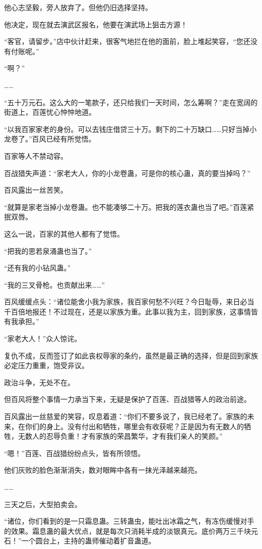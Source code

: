 \begin{this_body}
他心志坚毅，旁人放弃了。但他仍旧选择坚持。

他决定，现在就去演武区报名，他要在演武场上狙击方源！

“客官，请留步。”店中伙计赶来，很客气地拦在他的面前，脸上堆起笑容，“您还没有付账呢。”

“啊？”

……

“五十万元石。这么大的一笔款子，还只给我们一天时间，怎么筹啊？”走在宽阔的街道上，百莲忧心忡忡地道。

“以我百家家老的身份。可以去钱庄借贷三十万。剩下的二十万缺口……只好当掉小龙卷了。”百风已经有所觉悟。

百家等人不禁动容。

百战猎失声道：“家老大人，你的小龙卷蛊，可是你的核心蛊，真的要当掉吗？”

百风露出一丝苦笑。

“就算是家老当掉小龙卷蛊。也不能凑够二十万。把我的莲衣蛊也当了吧。”百莲紧抿双唇。

这么一说，百家的其他人都有了觉悟。

“把我的思若泉涌蛊也当了。”

“还有我的小钻风蛊。”

“我的三叉骨枪。也贡献出来……”

百风缓缓点头：“诸位能舍小我为家族，我百家何愁不兴旺？今日耻辱，来日必当千百倍地报还！不过现在，还是以家族为重。此事以我为主，回到家族，这事情皆有我承担。”

“家老大人！”众人惊诧。

复仇不成，反而签订了如此丧权辱家的条约，虽然是最正确的选择，但是回到家族必定压力重重，饱受非议。

政治斗争，无处不在。

但百风将整个事情一力承当下来，无疑是保护了百莲、百战猎等人的政治前途。

百风露出一丝慈爱的笑容，叹息着道：“你们不要多说了，我已经老了。家族的未来，在你们的身上。没有付出和牺牲，哪里会有收获呢？正是因为有无数人的牺牲，无数人的忍辱负重！才有家族的荣昌繁华，才有我们亲人的笑颜。”

“嗯！”百莲、百战猎纷纷点头，皆有所领悟。

他们灰败的脸色渐渐消失，数对眼眸中各有一抹光泽越来越亮。

……

三天之后，大型拍卖会。

“诸位，你们看到的是一只霜息蛊。三转蛊虫，能吐出冰霜之气，有冻伤缓慢对手的效果。霜息蛊的最大优点，就是每次只消耗半成的淡银真元。底价两万三千块元石！”一个圆台上，主持的蛊师催动着扩音蛊道。


\end{this_body}
